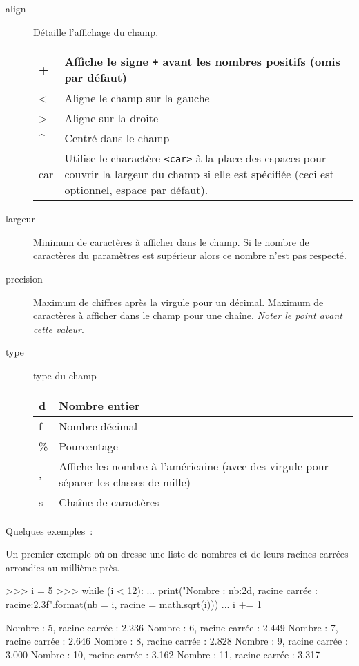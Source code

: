 \begin{description}
\item[align] Détaille l'affichage du champ.
\begin{center}
\tabulinesep=1.5mm
\begin{tabu}to 0.8
\hline
+ & Affiche le signe \texttt{+} avant les nombres positifs (omis par défaut)\\
\hline
< & Aligne le champ sur la gauche\\
\hline
> & Aligne sur la droite\\
\hline
\^{ } & Centré dans le champ\\
\hline
car & Utilise le charactère \texttt{<car>} à la place des espaces pour couvrir la largeur du champ si elle est spécifiée (ceci est optionnel, espace par défaut).\\
\hline
\end{tabu}
\end{center}

\item[largeur] Minimum de caractères à afficher dans le champ. Si le nombre de caractères du paramètres est supérieur alors ce nombre n'est pas respecté.
\item[precision] Maximum de chiffres après la virgule pour un décimal. Maximum de caractères à afficher dans le champ pour une chaîne. \textit{Noter le point avant cette valeur}.
\item[type] type du champ
\begin{center}
\tabulinesep=1.5mm
\begin{tabu}to 0.8
\hline
d & Nombre entier\\
\hline
f & Nombre décimal\\
\hline
\% & Pourcentage\\
\hline
, & Affiche les nombre à l'américaine (avec des virgule pour séparer les classes de mille)\\
\hline
s & Chaîne de caractères\\
\hline
\end{tabu}
\end{center}
\end{description}
Quelques exemples~:

\begin{exemple}
Un premier exemple où on dresse une liste de nombres et de leurs racines carrées arrondies
au millième près.
\begin{pythonexemple}
>>> i = 5
>>> while (i < 12):
...    print("Nombre : {nb:2d}, racine carrée : {racine:2.3f}".format(nb = i, racine = math.sqrt(i)))
...    i += 1
\end{pythonexemple}

\begin{result}
Nombre :  5, racine carrée : 2.236
Nombre :  6, racine carrée : 2.449
Nombre :  7, racine carrée : 2.646
Nombre :  8, racine carrée : 2.828
Nombre :  9, racine carrée : 3.000
Nombre : 10, racine carrée : 3.162
Nombre : 11, racine carrée : 3.317
\end{result}

\end{exemple}

